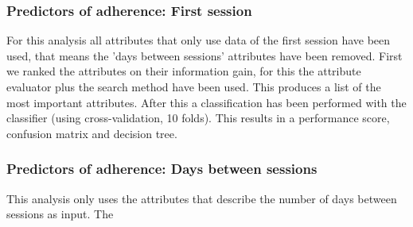 \subsubsection{Predictors of adherence: First session}
For this analysis all attributes that only use data of the first session have been used, that means the 'days between sessions' attributes have been removed. First we ranked the attributes on their information gain, for this the  attribute evaluator plus the  search method have been used. This produces a list of the most important attributes. After this a classification has been performed with the  classifier (using cross-validation, 10 folds). This results in a performance score, confusion matrix and decision tree.

\subsubsection{Predictors of adherence: Days between sessions}
This analysis only uses the attributes that describe the number of days between sessions as input. The  





















